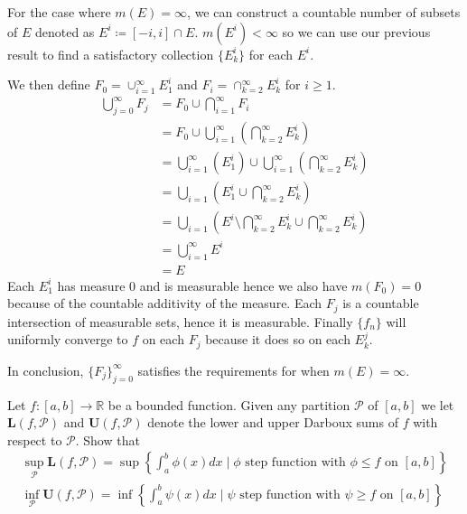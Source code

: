 \documentclass[11pt]{article}
\newcommand{\R}{\mathbb{R}}
\newcommand{\Par}{\mathcal{P}}
\newcommand{\Lo}{\mathbf{L}}
\newcommand{\U}{\mathbf{U}}
\begin{document}
    For the case where $m(E) = \infty$, we can construct a countable number of subsets of $E$ denoted as $E^{i} \coloneqq [-i, i] \cap E$.
    $m(E^{i}) < \infty$ so we can use our previous result to find a satisfactory collection $\{E_k ^{i}\}$ for each $E^{i}$.

    We then define $F_0 = \cup_{i=1}^{\infty} E_1 ^{i}$ and $F_i = \cap_{k=2}^{\infty} E_k^{i}$ for $i \geq 1$.
    \begin{align*}
        \bigcup_{j=0}^{\infty} F_j &= F_0 \cup \bigcap_{i=1}^{\infty} F_i \\
        &= F_0 \cup \bigcup_{i=1}^{\infty} \left( \bigcap_{k=2}^{\infty} E_k ^i \right) \\
        &= \bigcup_{i=1}^{\infty} \left( E_1 ^i \right) \cup \bigcup_{i=1}^{\infty} \left( \bigcap_{k=2}^{\infty} E_{k}^i \right) \\
        &= \bigcup_{i=1} \left( E_1 ^i \cup \bigcap_{k=2}^\infty E_k ^i \right) \\
        &= \bigcup_{i=1} \left( E ^i \setminus \bigcap_{k=2}^{\infty} E_k ^i \cup \bigcap_{k=2}^\infty E_k ^i \right) \tag{previous result}\\
        &= \bigcup_{i=1}^{\infty} E^i \\
        &= E
    \end{align*}
    Each $E_1^{i}$ has measure 0 and is measurable hence we also have $m(F_0) = 0$ because of the countable additivity of the measure.
    Each $F_j$ is a countable intersection of measurable sets, hence it is measurable.
    Finally $\{f_n\}$ will uniformly converge to $f$ on each $F_j$ because it does so on each $E_k^{j}$.

    In conclusion, $\{F_j\}_{j=0} ^{\infty}$ satisfies the requirements for when $m(E) = \infty$.

    \clearpage

    \begin{mybox}
        Let $f: [a,b] \rightarrow \R$ be a bounded function.
        Given any partition $\mathcal{P}$ of $[a,b]$ we let $\mathbf{L}(f,\mathcal{P})$ and $\U (f, \Par)$ denote the lower and upper Darboux sums of $f$ with respect to $\Par$.
        Show that
        \begin{gather*}
            \sup_{\Par} \Lo (f, \Par) = \sup \left\{ \int_{a}^{b} \phi (x)dx \mid \phi \text{ step function with } \phi \leq f \text{ on } [a,b] \right\} \\
            \inf_{\Par} \U (f, \Par) = \inf \left\{ \int_{a}^{b} \psi (x)dx \mid \psi \text{ step function with } \psi \geq f \text{ on } [a,b] \right\} \\
        \end{gather*}
    \end{mybox}
\end{document}
